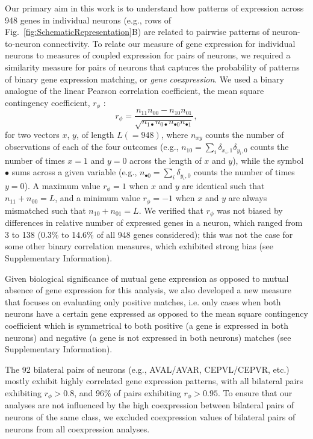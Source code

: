 \documentclass[10pt,letterpaper]{article}
\begin{document}
Our primary aim in this work is to understand how patterns of expression across 948 genes in individual neurons (e.g., rows of Fig.~\ref{fig:SchematicRepresentation}B) are related to pairwise patterns of neuron-to-neuron connectivity.
To relate our measure of gene expression for individual neurons to measures of coupled expression for pairs of neurons, we required a similarity measure for pairs of neurons that captures the probability of patterns of binary gene expression matching, or \emph{gene coexpression}.
We used a binary analogue of the linear Pearson correlation coefficient, the mean square contingency coefficient, $r_\phi$ \cite{Warrens2008}:
\begin{equation} \label{eq:rphi}
    r_\phi = \frac{n_{11}n_{00} - n_{10}n_{01}}{\sqrt{n_{1\bullet}n_{0\bullet}n_{\bullet 0}n_{\bullet 1}}},
\end{equation}
for two vectors $x$, $y$, of length $L (=948)$, where $n_{xy}$ counts the number of observations of each of the four outcomes (e.g., $n_{10} = \sum_i \delta_{x_i,1}\delta_{y_i,0}$ counts the number of times $x=1$ and $y=0$ across the length of $x$ and $y$), while the symbol $\bullet$ sums across a given variable (e.g., $n_{\bullet 0} = \sum_i \delta_{y_i,0}$ counts the number of times $y = 0$).
A maximum value $r_\phi = 1$ when $x$ and $y$ are identical such that $n_{11} + n_{00} = L$, and a minimum value $r_\phi = -1$ when $x$ and $y$ are always mismatched such that $n_{10} + n_{01} = L$.
We verified that $r_\phi$ was not biased by differences in relative number of expressed genes in a neuron, which ranged from 3 to 138 (0.3\% to 14.6\% of all 948 genes considered); this was not the case for some other binary correlation measures, which exhibited strong bias (see Supplementary Information).

Given biological significance of mutual gene expression as opposed to mutual absence of gene expression for this analysis, we also developed a new measure that focuses on evaluating only positive matches, i.e. only cases when both neurons have a certain gene expressed as opposed to the mean square contingency coefficient which is symmetrical to both positive (a gene is expressed in both neurons) and negative (a gene is not expressed in both neurons) matches (see Supplementary Information).

The 92 bilateral pairs of neurons (e.g., AVAL/AVAR, CEPVL/CEPVR, etc.) mostly exhibit highly correlated gene expression patterns, with all bilateral pairs exhibiting $r_\phi > 0.8$, and 96\% of pairs exhibiting $r_\phi > 0.95$.
To ensure that our analyses are not influenced by the high coexpression between bilateral pairs of neurons of the same class, we excluded coexpression values of bilateral pairs of neurons from all coexpression analyses.
\end{document}
